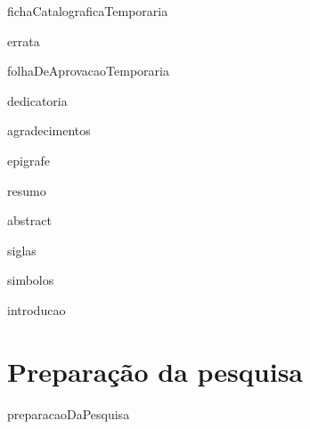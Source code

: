 \documentclass[
	12pt,				%
	openright,			%
	twoside,			%
	a4paper,			%
	english,			%
	french,				%
	spanish,			%
	brazil				%
	]{abntex2}
\begin{document}

\frenchspacing


\pretextual
\imprimircapa

\imprimirfolhaderosto*

{fichaCatalograficaTemporaria}
%     

{errata}

{folhaDeAprovacaoTemporaria}
% 

{dedicatoria}

{agradecimentos}

{epigrafe}

\setlength{\absparsep}{18pt} %
{resumo}


{abstract}

\listoffigures*
\cleardoublepage

\listofquadros*
\cleardoublepage

\listoftables*
\cleardoublepage

{siglas}

{simbolos}

\tableofcontents*
\cleardoublepage

\textual

{introducao}

\part{Preparação da pesquisa}
{preparacaoDaPesquisa}
\end{document}
